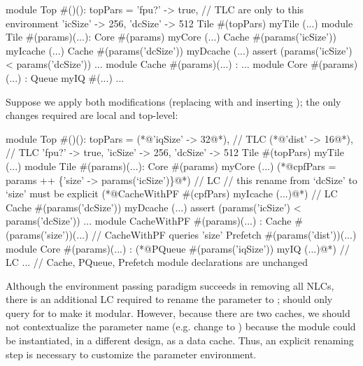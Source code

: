 
\begin{phdl}
module Top #()():
  topPars = {'fpu?'   -> true, // TLC are only to this environment 
             'icSize' -> 256,
             'dcSize' -> 512}
  Tile #(topPars) myTile (...)
module Tile #(params)(...):
  Core  #(params) myCore (...)
  Cache #(params('icSize')) myIcache (...)
  Cache #(params('dcSize')) myDcache (...)
  assert (params('icSize') < params('dcSize')) ...
module Cache #(params)(...) : ...
module Core  #(params)(...) :
  Queue myIQ #(...) ...
\end{phdl} 

Suppose we apply both modifications (replacing  with  and inserting ); the only changes required are local and top-level:

\begin{phdl}
module Top #()():
  topPars = {(*@\textcolor[rgb]{0.8,0,0}{'iqSize' -> 32}@*),                                     // TLC
             (*@\textcolor[rgb]{1,0,0}{'dist' -> 16}@*),                                       // TLC
             'fpu?'   -> true,
             'icSize' -> 256,
             'dcSize' -> 512}
  Tile #(topPars) myTile (...)
module Tile #(params)(...):
  Core  #(params) myCore (...)
  (*@\textcolor[rgb]{1,0,0}{cpfPars = params ++ \{'size' -> params(`icSize')\}}@*)               // LC
    // this rename from `dcSize' to `size' must be explicit
  (*@\textcolor[rgb]{1,0,0}{CacheWithPF \#(cpfPars) myIcache (...)}@*)                          // LC
  Cache #(params('dcSize')) myDcache (...)
  assert (params('icSize') < params('dcSize')) ...
module CacheWithPF #(params)(...) :
  Cache #(params('size'))(...) // CacheWithPF queries 'size'
  Prefetch #(params('dist'))(...)
module Core #(params)(...) :
  (*@\textcolor[rgb]{.8,0,0}{PQueue \#(params('iqSize')) myIQ (...)}@*)                          // LC
... // Cache, PQueue, Prefetch module declarations are unchanged
\end{phdl} 

Although the environment passing paradigm succeeds in removing all NLCs, there is an additional LC required to rename the  parameter to ; 
 should only query for  to make it modular. 
However, because there are two caches, we should not contextualize the parameter name (e.g. change  to ) because the module could be instantiated, in a different design, as a data cache. 
Thus, an explicit renaming step is necessary to customize the  parameter environment.

